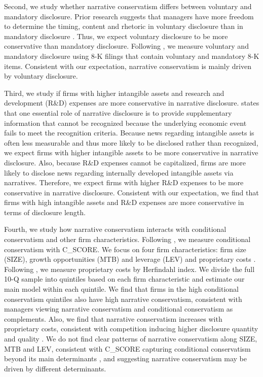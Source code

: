 \documentclass[letterpaper,12pt]{article}
\begin{document}
\begin{spacing}{1.5}
Second, we study whether narrative conservatism differs between voluntary and mandatory disclosure. Prior research suggests that managers have more freedom to determine the timing, content and rhetoric in voluntary disclosure than in mandatory disclosure \cite{segalAreManagersStrategic2016}. Thus, we expect voluntary disclosure to be more conservative than mandatory disclosure. Following , we measure voluntary and mandatory disclosure using 8-K filings that contain voluntary and mandatory 8-K items. Consistent with our expectation, narrative conservatism is mainly driven by voluntary disclosure. 

Third, we study if firms with higher intangible assets and research and development (R\&D) expenses are more conservative in narrative disclosure.  states that one essential role of narrative disclosure is to provide supplementary information that cannot be recognized because the underlying economic event fails to meet the recognition criteria. Because news regarding intangible assets is often less measurable and thus more likely to be disclosed rather than recognized, we expect firms with higher intangible assets to be more conservative in narrative disclosure. Also, because R\&D expenses cannot be capitalized, firms are more likely to disclose news regarding internally developed intangible assets via narratives. Therefore, we expect firms with higher R\&D expenses to be more conservative in narrative disclosure. Consistent with our expectation, we find that firms with high intangible assets and R\&D expenses are more conservative in terms of disclosure length.

Fourth, we study how narrative conservatism interacts with conditional conservatism and other firm characteristics. Following , we measure conditional conservatism with C\_SCORE. We focus on four firm characteristics: firm size (SIZE), growth opportunities (MTB) and leverage (LEV) \cite{wattsConservatismAccountingPart2003, qiangEffectsContractingLitigation2007, khanEstimationEmpiricalProperties2009, laraEconomicDeterminantsConditional2009} and proprietary costs \cite{verrecchiaDiscretionaryDisclosure1983, liImpactsProductMarket2010}. Following , we measure proprietary costs by Herfindahl index. We divide the full 10-Q sample into quintiles based on each firm characteristic and estimate our main model within each quintile. We find that firms in the high conditional conservatism quintiles also have high narrative conservatism, consistent with managers viewing narrative conservatism and conditional conservatism as complements. Also, we find that narrative conservatism increases with proprietary costs, consistent with competition inducing higher disclosure quantity and quality \cite{liImpactsProductMarket2010}. We do not find clear patterns of narrative conservatism along SIZE, MTB and LEV, consistent with C\_SCORE capturing conditional conservatism beyond its main determinants \cite{khanEstimationEmpiricalProperties2009}, and suggesting narrative conservatism may be driven by different determinants.


\end{spacing}
\end{document}
